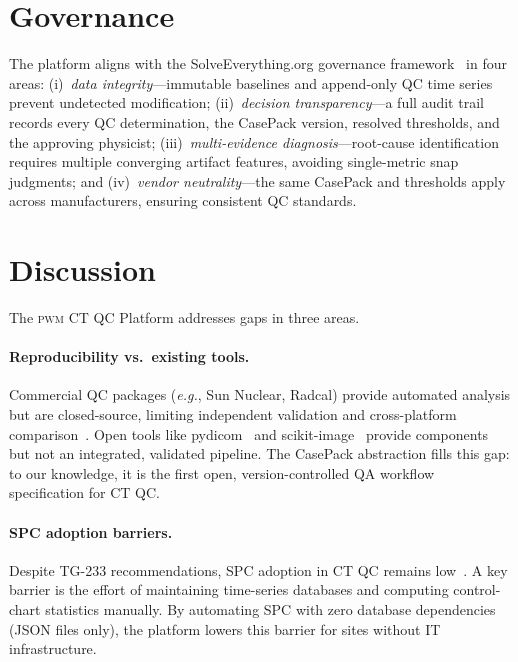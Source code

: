 \documentclass[11pt]{article}
\newcommand{\pwm}{\textsc{pwm}}
\newcommand{\eg}{\textit{e.g.}}
\begin{document}
\section{Governance}
\label{sec:governance}

The platform aligns with the SolveEverything.org governance
framework~\cite{solveeverything} in four areas:
(i)~\emph{data integrity}---immutable baselines and append-only QC
time series prevent undetected modification;
(ii)~\emph{decision transparency}---a full audit trail records every
QC determination, the CasePack version, resolved thresholds, and
the approving physicist;
(iii)~\emph{multi-evidence diagnosis}---root-cause identification
requires multiple converging artifact features, avoiding
single-metric snap judgments; and
(iv)~\emph{vendor neutrality}---the same CasePack and thresholds
apply across manufacturers, ensuring consistent QC standards.


\section{Discussion}
\label{sec:discussion}

The \pwm{} CT QC Platform addresses gaps in three areas.

\paragraph{Reproducibility vs.\ existing tools.}
Commercial QC packages (\eg, Sun Nuclear, Radcal) provide automated
analysis but are closed-source, limiting independent validation and
cross-platform comparison~\cite{nowik2015ct_qa_automation}.
Open tools like pydicom~\cite{pydicom} and
scikit-image~\cite{scikit_image} provide components but not an
integrated, validated pipeline.
The CasePack abstraction fills this gap: to our knowledge, it is the
first open, version-controlled QA workflow specification for CT QC.

\paragraph{SPC adoption barriers.}
Despite TG-233 recommendations, SPC adoption in CT QC remains
low~\cite{pawlicki2005spc,able2016spc_ct}.
A key barrier is the effort of maintaining time-series databases and
computing control-chart statistics manually.
By automating SPC with zero database dependencies (JSON files only),
the platform lowers this barrier for sites without IT infrastructure.
\end{document}
